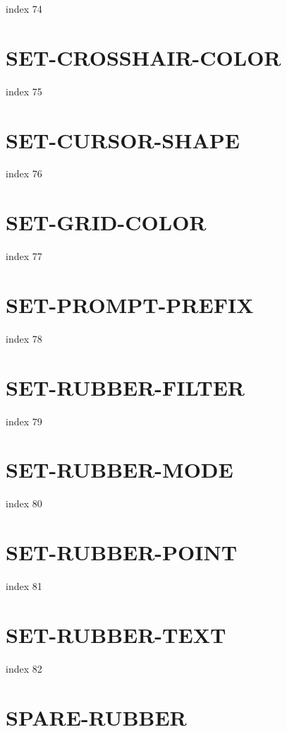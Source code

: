 \documentclass[10pt]{report}
\begin{document}
index 74

\section{SET-CROSSHAIR-COLOR}

index 75

\section{SET-CURSOR-SHAPE}

index 76

\section{SET-GRID-COLOR}

index 77

\section{SET-PROMPT-PREFIX}

index 78

\section{SET-RUBBER-FILTER}

index 79

\section{SET-RUBBER-MODE}

index 80

\section{SET-RUBBER-POINT}

index 81

\section{SET-RUBBER-TEXT}

index 82

\section{SPARE-RUBBER}
\end{document}
